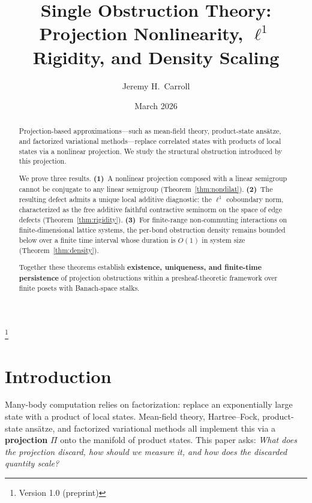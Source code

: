 \documentclass[12pt,a4paper]{amsart}
\theoremstyle{plain}
\theoremstyle{definition}
\theoremstyle{remark}
\begin{document}

\title[Single Obstruction Theory]{%
  Single Obstruction Theory:\\
  Projection Nonlinearity, $\ell^1$ Rigidity, and Density Scaling}

\author{Jeremy H.\ Carroll}
\date{March 2026}
\thanks{Version 1.0 (preprint)}

\begin{abstract}
Projection-based approximations---such as mean-field theory,
product-state ans\"atze, and factorized variational methods---replace
correlated states with products of local states via a nonlinear
projection. We study the structural obstruction introduced by this
projection.

We prove three results.
\textbf{(1)}~A nonlinear projection composed with a linear semigroup
cannot be conjugate to any linear semigroup (Theorem~\ref{thm:nondilat}).
\textbf{(2)}~The resulting defect admits a unique local additive
diagnostic: the $\ell^1$ coboundary norm, characterized as the free
additive faithful contractive seminorm on the space of edge defects
(Theorem~\ref{thm:rigidity}).
\textbf{(3)}~For finite-range non-commuting interactions on
finite-dimensional lattice systems, the per-bond obstruction density
remains bounded below over a finite time interval whose duration is
$O(1)$ in system size (Theorem~\ref{thm:density}).

Together these theorems establish \textbf{existence, uniqueness, and
finite-time persistence} of projection obstructions within a
presheaf-theoretic framework over finite posets with Banach-space stalks.
\end{abstract}

\maketitle


\section{Introduction}\label{sec:intro}

Many-body computation relies on factorization: replace an
exponentially large state with a product of local states. Mean-field
theory, Hartree--Fock, product-state ans\"atze, and factorized
variational methods all implement this via a \textbf{projection}
$\Pi$ onto the manifold of product states. This paper asks:
\emph{What does the projection discard, how should we measure it, and
how does the discarded quantity scale?}
\end{document}
